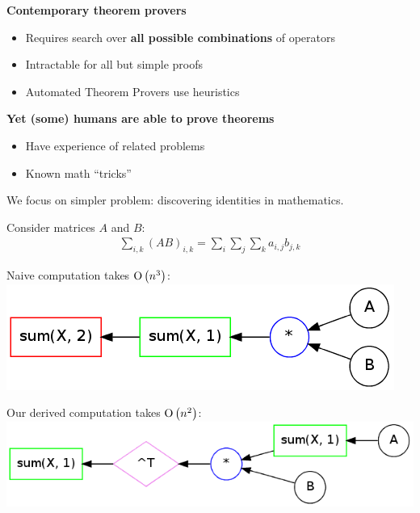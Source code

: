\documentclass[landscape,a0b]{a0poster_csml_v2}
\begin{document}
\begin{poster}
\begin{PosterColumn}
\vspace{0.7cm}


\begin{minipage}[hc]{0.45\textwidth}
  {\bf Contemporary theorem provers}
  \begin{itemize}
    \item Requires search over {\bf all possible combinations} of operators
    \item Intractable for all but simple proofs
    \item Automated Theorem Provers use heuristics
  \end{itemize}
\end{minipage}
\hfill
\begin{minipage}[hc]{0.45\textwidth}
  {\bf Yet (some) humans are able to prove theorems}
  \vspace{0.5cm}
  \begin{itemize} 
    \item Have experience of related problems 
    \item Known math ``tricks''
  \end{itemize} 
\end{minipage}

\vspace{1.2cm}
We focus on simpler problem: discovering identities in mathematics.


\begin{minipage}[hc]{0.32\textwidth}
  \centering
  Consider matrices $A$ and $B$:
  \begin{align*}
    \sum_{i, k}(AB)_{i, k} = \sum_i \sum_j \sum_k a_{i,j} b_{j, k}
  \end{align*}
\end{minipage}
\hfill
\begin{minipage}[hc]{0.32\textwidth}
  \centering
  Naive computation takes $\operatorname{O}\left(n^3\right)$: 
  \includegraphics[width=0.95\linewidth]{imgs/example1_brute.png}
\end{minipage}
\hfill
\begin{minipage}[hc]{0.32\textwidth}
  \centering
  Our derived computation takes $\operatorname{O}\left(n^2\right)$: 
  \includegraphics[width=0.95\linewidth]{imgs/example1_opt.png}
\end{minipage}
\vspace{1cm}


\end{PosterColumn}
\end{poster}
\end{document}
